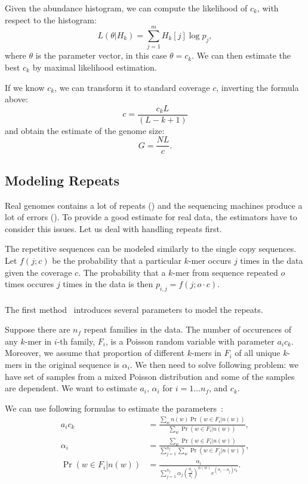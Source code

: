 Given the abundance histogram, we can compute the likelihood of $c_k$, with respect to the histogram:
$$L(\theta | H_k) = \sum_{j=1}^m H_k[j] \log p_j,$$
where $\theta$ is the parameter vector, in this case $\theta = c_k$.
We can then estimate the best $c_k$ by maximal likelihood estimation.

If we know $c_k$, we can transform it to standard coverage $c$, inverting the formula above:
$$c = \frac{c_k L}{(L - k + 1)}$$
and obtain the estimate of the genome size:
$$G = \frac{NL}{c}.$$

\subsection{Modeling Repeats}\label{subsec:repeatmodles}

Real genomes contains a lot of repeats () and the sequencing machines produce a lot of errors (). To provide a good estimate for real data, the estimators have to consider this issues. Let us deal with handling repeats first.

The repetitive sequences can be modeled similarly to the single copy sequences. Let $f(j; c)$ be the probability that a particular $k$-mer occurs $j$ times in the data given the coverage $c$. The probability that a $k$-mer from sequence repeated $o$ times occures $j$ times in the data is then $p_{i,j} = f(j; o\cdot c)$.

\paragraph{}The first method~\cite{waterman} introduces several parameters to model the repeats.

Suppose there are $n_f$ repeat families in the data. The number of occurences of any $k$-mer in $i$-th family, $F_i$, is a Poisson random variable with parameter $a_i c_k$. Moreover, we assume that proportion of different $k$-mers in $F_i$ of all unique $k$-mers in the original sequence is $\alpha_i$.
We then need to solve following problem: we have set of samples from a mixed Poisson distribution and some of the samples are dependent. We want to estimate $a_i,\,\alpha_i$ for $i = 1\dots n_f$, and $c_k$.

We can use following formulas to estimate the parameters~\cite{waterman}:
\begin{align*}
a_i c_k & = \frac{\displaystyle\sum_w n(w) \Pr(w \in F_i | n(w))}{\displaystyle\sum_w \Pr(w \in F_i | n(w))},\\[1.5ex]
\alpha_i & = \frac{\displaystyle\sum_w \Pr(w \in F_i | n(w))}{\displaystyle\sum_{j=1}^{n_f}\sum_w \Pr(w \in F_j | n(w))},\\[1.5ex]
\Pr(w \in F_i | n(w)) & = \frac{\alpha_i}{\displaystyle\sum_{j=1}^{n_f} \alpha_j {\left(\frac{a_j}{a_i}\right)}^{n(w)} e^{(\alpha_i-a_j)c_k}}.
\end{align*}

